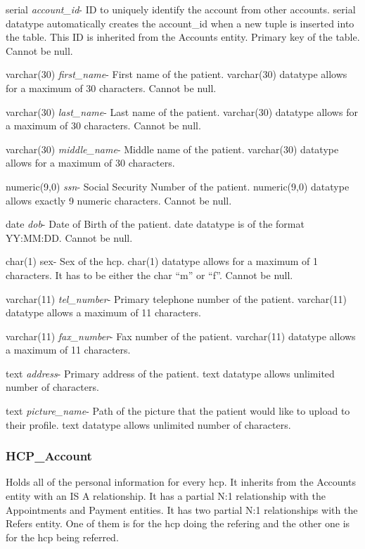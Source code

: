 \begin{description}
\item serial \textit{account\_id}- ID to uniquely identify the account from other accounts. serial datatype automatically creates the account\_id when a new tuple is inserted into the table.  This ID is inherited from the Accounts entity. Primary key of the table.  Cannot be null.
\item varchar(30) \textit{first\_name}-  First name of the patient.  varchar(30) datatype allows for a maximum of 30 characters.  Cannot be null.
\item varchar(30) \textit{last\_name}- Last name of the patient.  varchar(30) datatype allows for a maximum of 30 characters.  Cannot be null.
\item varchar(30) \textit{middle\_name}- Middle name of the patient. varchar(30) datatype allows for a maximum of 30 characters.
\item numeric(9,0) \textit{ssn}- Social Security Number of the patient. numeric(9,0) datatype allows exactly 9 numeric characters.  Cannot be null.
\item date \textit{dob}- Date of Birth of the patient.  date datatype is of the format YY:MM:DD.  Cannot be null.
\item char(1) sex- Sex of the hcp. char(1) datatype allows for a maximum of 1 characters.  It has to be either the char ``m'' or ``f''.  Cannot be null.
\item varchar(11) \textit{tel\_number}- Primary telephone number of the patient.  varchar(11) datatype allows a maximum of 11 characters.
\item varchar(11) \textit{fax\_number}- Fax number of the patient.  varchar(11) datatype allows a maximum of 11 characters.
\item text \textit{address}- Primary address of the patient.  text datatype allows unlimited number of characters.
\item text \textit{picture\_name}- Path of the picture that the patient would like to upload to their profile.  text datatype allows unlimited number of characters.
\end{description}

\subsubsection{HCP\_Account}
Holds all of the personal information for every hcp.  It inherits from the Accounts entity with an IS A relationship.  It has a partial N:1 relationship with the Appointments and Payment entities.  It has two partial N:1 relationships with the Refers entity.  One of them is for the hcp doing the refering and the other one is for the hcp being referred.

